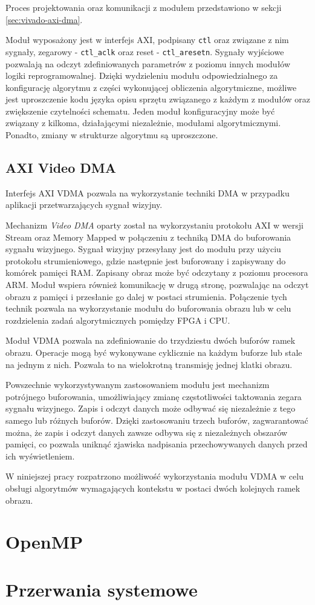 Proces projektowania oraz komunikacji z modułem przedstawiono w sekcji \ref{sec:vivado-axi-dma}.

Moduł wyposażony jest w interfejs AXI, podpisany \texttt{ctl} oraz związane z nim sygnały, zegarowy - \texttt{ctl\_aclk} oraz reset - \texttt{ctl\_aresetn}. Sygnały wyjściowe pozwalają na odczyt zdefiniowanych parametrów z poziomu innych modułów logiki reprogramowalnej. Dzięki wydzieleniu modułu odpowiedzialnego za konfigurację algorytmu z części wykonującej obliczenia algorytmiczne, możliwe jest uproszczenie kodu języka opisu sprzętu związanego z każdym z modułów oraz zwiększenie czytelności schematu. Jeden moduł konfiguracyjny może być związany z kilkoma, działającymi niezależnie, modułami algorytmicznymi. Ponadto, zmiany w strukturze algorytmu są uproszczone.


\subsection{AXI Video DMA}
\label{sec:axi-vdma}
Interfejs AXI VDMA pozwala na wykorzystanie techniki DMA w przypadku aplikacji przetwarzających sygnał wizyjny.

Mechanizm \emph{Video DMA} oparty został na wykorzystaniu protokołu AXI w wersji Stream oraz Memory Mapped w połączeniu z techniką DMA do buforowania sygnału wizyjnego. 
Sygnał wizyjny przesyłany jest do modułu przy użyciu protokołu strumieniowego, gdzie następnie jest buforowany i zapisywany do komórek pamięci RAM. Zapisany obraz może być odczytany z poziomu procesora ARM. Moduł wspiera również komunikację w drugą stronę, pozwalając na odczyt obrazu z pamięci i przesłanie go dalej w postaci strumienia. Połączenie tych technik pozwala na wykorzystanie modułu do buforowania obrazu lub w celu rozdzielenia zadań algorytmicznych pomiędzy FPGA i CPU.

Moduł VDMA pozwala na zdefiniowanie do trzydziestu dwóch buforów ramek obrazu. Operacje mogą być wykonywane cyklicznie na każdym buforze lub stale na jednym z nich. Pozwala to na wielokrotną transmisję jednej klatki obrazu.

Powszechnie wykorzystywanym zastosowaniem modułu jest mechanizm potrójnego buforowania, umożliwiający zmianę częstotliwości taktowania zegara sygnału wizyjnego. Zapis i odczyt danych może odbywać się niezależnie z tego samego lub różnych buforów. Dzięki zastosowaniu trzech buforów, zagwarantować można, że zapis i odczyt danych zawsze odbywa się z niezależnych obszarów pamięci, co pozwala uniknąć zjawiska nadpisania przechowywanych danych przed ich wyświetleniem.

W niniejszej pracy rozpatrzono możliwość wykorzystania modułu VDMA w celu obsługi algorytmów wymagających kontekstu w postaci dwóch kolejnych ramek obrazu.

\section{OpenMP}

\section{Przerwania systemowe}
\label{sec:axi-interrupts}